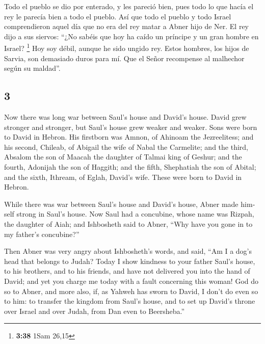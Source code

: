 \begin{paracol}{2}
 Todo el pueblo se dio por enterado, y les pareció bien,
pues todo lo que hacía el rey le parecía bien a todo el pueblo.
 Así que todo el pueblo y todo Israel comprendieron aquel
día que no era del rey matar a Abner hijo de Ner.  El rey
dijo a sus siervos: ``¿No sabéis que hoy ha caído un príncipe y un gran
hombre en Israel? \footnote{\textbf{3:38} 1Sam 26,15} 
Hoy soy débil, aunque he sido ungido rey. Estos hombres, los hijos de
Sarvia, son demasiado duros para mí. Que el Señor recompense al
malhechor según su maldad''.

\switchcolumn
\begin{otherlanguage}{english}

\hypertarget{section-5}{%
\section{3}\label{section-5}}

 Now there was long war between Saul's house and David's
house. David grew stronger and stronger, but Saul's house grew weaker
and weaker.  Sons were born to David in Hebron. His
firstborn was Amnon, of Ahinoam the Jezreelitess;  and his
second, Chileab, of Abigail the wife of Nabal the Carmelite; and the
third, Absalom the son of Maacah the daughter of Talmai king of Geshur;
 and the fourth, Adonijah the son of Haggith; and the
fifth, Shephatiah the son of Abital;  and the sixth,
Ithream, of Eglah, David's wife. These were born to David in Hebron.

 While there was war between Saul's house and David's
house, Abner made himself strong in Saul's house.  Now
Saul had a concubine, whose name was Rizpah, the daughter of Aiah; and
Ishbosheth said to Abner, ``Why have you gone in to my father's
concubine?''

 Then Abner was very angry about Ishbosheth's words, and
said, ``Am I a dog's head that belongs to Judah? Today I show kindness
to your father Saul's house, to his brothers, and to his friends, and
have not delivered you into the hand of David; and yet you charge me
today with a fault concerning this woman!  God do so to
Abner, and more also, if, as Yahweh has sworn to David, I don't do even
so to him:  to transfer the kingdom from Saul's house,
and to set up David's throne over Israel and over Judah, from Dan even
to Beersheba.''


\end{otherlanguage}
\end{paracol}
